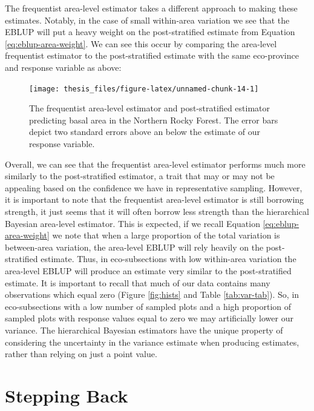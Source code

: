\documentclass[12pt,twoside]{reedthesis}
\begin{document}
The frequentist area-level estimator takes a different approach to making these estimates. Notably, in the case of small within-area variation we see that the EBLUP will put a heavy weight on the post-stratified estimate from Equation \eqref{eq:eblup-area-weight}. We can see this occur by comparing the area-level frequentist estimator to the post-stratified estimate with the same eco-province and response variable as above:
\begin{figure}

{\centering \texttt{[image: thesis\_files/figure-latex/unnamed-chunk-14-1]} 

}

\caption[EBLUP area-level and Post-stratified estimates in M333]{The frequentist area-level estimator and post-stratified estimator predicting basal area in the Northern Rocky Forest. The error bars depict two standard errors above an below the estimate of our response variable.}\label{fig:unnamed-chunk-14}
\end{figure}
Overall, we can see that the frequentist area-level estimator performs much more similarly to the post-stratified estimator, a trait that may or may not be appealing based on the confidence we have in representative sampling. However, it is important to note that the frequentist area-level estimator is still borrowing strength, it just seems that it will often borrow less strength than the hierarchical Bayesian area-level estimator. This is expected, if we recall Equation \eqref{eq:eblup-area-weight} we note that when a large proportion of the total variation is between-area variation, the area-level EBLUP will rely heavily on the post-stratified estimate. Thus, in eco-subsections with low within-area variation the area-level EBLUP will produce an estimate very similar to the post-stratified estimate. It is important to recall that much of our data contains many observations which equal zero (Figure \ref{fig:hists} and Table \ref{tab:var-tab}). So, in eco-subsections with a low number of sampled plots and a high proportion of sampled plots with response values equal to zero we may artificially lower our variance. The hierarchical Bayesian estimators have the unique property of considering the uncertainty in the variance estimate when producing estimates, rather than relying on just a point value.

\hypertarget{stepping-back}{%
\section{Stepping Back}\label{stepping-back}}
\end{document}
